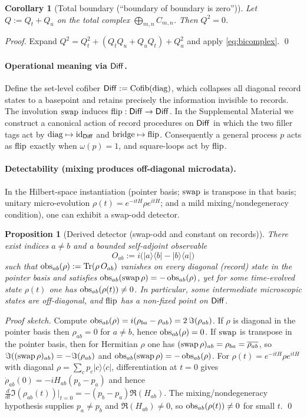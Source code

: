 \documentclass[aps,prl,reprint,floatfix]{revtex4-2}
\theoremstyle{plain}
\newtheorem{proposition}{Proposition}
\newtheorem{corollary}{Corollary}
\theoremstyle{definition}
\begin{document}
\begin{corollary}[Total boundary (``boundary of boundary is zero'')]
Let $Q:=Q_t+Q_u$ on the total complex $\bigoplus_{m,n}C_{m,n}$. Then $Q^2=0$.
\end{corollary}

\noindent\emph{Proof.}
Expand $Q^2=Q_t^2+(Q_tQ_u+Q_uQ_t)+Q_u^2$ and apply \eqref{eq:bicomplex}. \qed

\paragraph{Operational meaning via $\mathsf{Diff}$.}
Define the set-level cofiber $\mathsf{Diff}:=\operatorname{Cofib}(\operatorname{diag})$, which collapses all diagonal record states to a basepoint and retains
precisely the information invisible to records. The involution $\operatorname{swap}$ induces $\operatorname{flip}:\mathsf{Diff}\to\mathsf{Diff}$.
In the Supplemental Material we construct a canonical action of record procedures on $\mathsf{Diff}$ in which the two filler tags act by
$\mathrm{diag}\mapsto \mathrm{id}_{\mathsf{Diff}}$ and $\mathrm{bridge}\mapsto \operatorname{flip}$.
Consequently a general process $p$ acts as $\operatorname{flip}$ exactly when $\omega(p)=1$, and square-loops act by $\operatorname{flip}$.

\paragraph{Detectability (mixing produces off-diagonal microdata).}
In the Hilbert-space instantiation (pointer basis; $\operatorname{swap}$ is transpose in that basis; unitary micro-evolution
$\rho(t)=e^{-itH}\rho e^{itH}$; and a mild mixing/nondegeneracy condition), one can exhibit a swap-odd detector.

\begin{proposition}[Derived detector (swap-odd and constant on records)]
\label{prop:detector}
There exist indices $a\ne b$ and a bounded self-adjoint observable
\[
O_{ab}:= i\big(\lvert a\rangle\langle b\rvert-\lvert b\rangle\langle a\rvert\big)
\]
such that $\operatorname{obs}_{ab}(\rho):=\mathrm{Tr}(\rho\,O_{ab})$ vanishes on every diagonal (record) state in the pointer basis and satisfies
$\operatorname{obs}_{ab}(\operatorname{swap}\rho)=-\operatorname{obs}_{ab}(\rho)$, yet for some time-evolved state $\rho(t)$ one has $\operatorname{obs}_{ab}(\rho(t))\ne 0$.
In particular, some intermediate microscopic states are off-diagonal, and $\operatorname{flip}$ has a non-fixed point on $\mathsf{Diff}$.
\end{proposition}

\noindent\emph{Proof sketch.}
Compute $\operatorname{obs}_{ab}(\rho)=i(\rho_{ba}-\rho_{ab})=2\,\Im(\rho_{ab})$.
If $\rho$ is diagonal in the pointer basis then $\rho_{ab}=0$ for $a\ne b$, hence $\operatorname{obs}_{ab}(\rho)=0$.
If $\operatorname{swap}$ is transpose in the pointer basis, then for Hermitian $\rho$ one has $(\operatorname{swap}\rho)_{ab}=\rho_{ba}=\overline{\rho_{ab}}$,
so $\Im((\operatorname{swap}\rho)_{ab})=-\Im(\rho_{ab})$ and $\operatorname{obs}_{ab}(\operatorname{swap}\rho)=-\operatorname{obs}_{ab}(\rho)$.
For $\rho(t)=e^{-itH}\rho e^{itH}$ with diagonal $\rho=\sum_c p_c\lvert c\rangle\langle c\rvert$, differentiation at $t=0$ gives
$\dot{\rho}_{ab}(0)=-iH_{ab}(p_b-p_a)$ and hence $\frac{d}{dt}\Im(\rho_{ab}(t))\rvert_{t=0}=-(p_b-p_a)\Re(H_{ab})$.
The mixing/nondegeneracy hypothesis supplies $p_a\ne p_b$ and $\Re(H_{ab})\ne 0$, so $\operatorname{obs}_{ab}(\rho(t))\ne 0$ for small $t$. \qed
\end{document}
